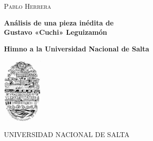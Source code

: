 \begin{center}
\vspace{2cm}

\textsc{Pablo Herrera}

\vspace{4cm}

\textbf{\LARGE Análisis de una pieza inédita de\\ Gustavo «Cuchi» Leguizamón}

\vspace{1cm}

\textbf{\large Himno a la Universidad Nacional de Salta}

\vspace{3cm}

\includegraphics[width=2cm]{img/escudo_unsa}

UNIVERSIDAD NACIONAL DE SALTA
\end{center}


